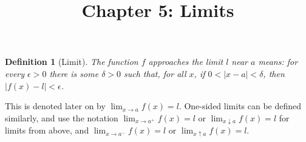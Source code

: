 \documentclass{article}
\newtheorem{definition}{Definition}
\begin{document}
\title{Chapter 5: Limits}
\maketitle

\begin{definition}[Limit]
  The function \emph{$f$ approaches the limit $l$ near $a$} means: for every
  $\epsilon > 0$ there is some $\delta > 0$ such that, for all $x$, if $0 < |x
  - a| < \delta$, then $|f(x) - l| < \epsilon$.
\end{definition}
This is denoted later on by $\lim_{x \rightarrow a} f(x) = l$. One-sided limits
can be defined similarly, and use the notation $\lim_{x \rightarrow a^+} f(x) =
l$ or $\lim_{x \downarrow a} f(x) = l$ for limits from above, and $\lim_{x
\rightarrow a^-} f(x) = l$ or $\lim_{x \uparrow a} f(x) = l$.
\end{document}
